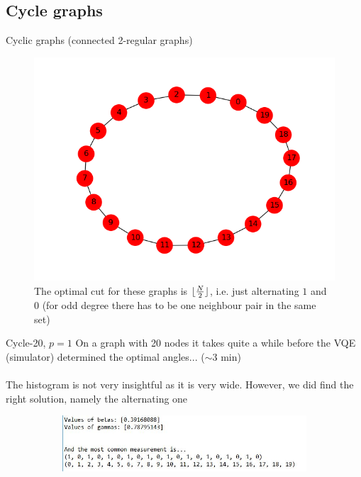 \documentclass{beamer}
\DeclarePairedDelimiter\floor{\lfloor}{\rfloor}
\begin{document}
\subsection{Cycle graphs}
\begin{frame}{Cyclic graphs (connected 2-regular graphs)}
\begin{figure}
	\includegraphics[scale=0.6]{figures/cycle20-graph.png}
	\caption*{The optimal cut for these graphs is $\floor{\frac{N}{2}}$, i.e. just alternating $1$ and $0$ (for odd degree there has to be one neighbour pair in the same set)}
\end{figure}
	
\end{frame}

\begin{frame}{Cycle-20, $p = 1$}
On a graph with 20 nodes it takes quite a while before the VQE (simulator) determined the optimal angles... ($\sim$3 min) \\~\\
The histogram is not very insightful as it is very wide. However, we did find the right solution, namely the alternating one
\begin{figure}
	\centering
	\begin{figure}
		\includegraphics[scale=0.7]{figures/cycle20-p1.JPG}
	\end{figure}
	
\end{figure}
\end{frame}
\end{document}
